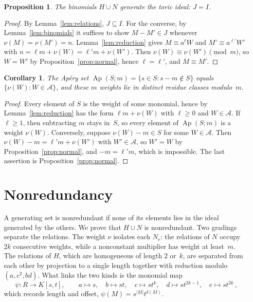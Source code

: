 \documentclass[11pt,letterpaper]{article}
\numberwithin{equation}{section}
\theoremstyle{plain}
\newtheorem{proposition}[theorem]{Proposition}
\newtheorem{corollary}[theorem]{Corollary}
\theoremstyle{remark}
\newcommand{\Ap}{\operatorname{Ap}}
\newcommand{\NF}{\mathcal{A}}
\newcommand{\len}[1]{\lvert #1\rvert}
\begin{document}
\begin{proposition}\label{prop:generation}
The binomials $H\cup N$ generate the toric ideal: $J=I$.
\end{proposition}

\begin{proof}
By Lemma~\ref{lem:relations}, $J\subseteq I$. For the converse, by Lemma~\ref{lem:binomials} it suffices to show $M-M'\in J$ whenever $\nu(M)=\nu(M')=n$. Lemma~\ref{lem:reduction} gives $M\equiv a^{\ell}W$ and $M'\equiv a^{\ell'}W'$ with $n=\ell m+\nu(W)=\ell'm+\nu(W')$. Then $\nu(W)\equiv\nu(W')\pmod m$, so $W=W'$ by Proposition~\ref{prop:normal}, hence $\ell=\ell'$, and $M\equiv M'$.
\end{proof}

\begin{corollary}\label{cor:apery}
The Ap\'ery set $\Ap(S;m)=\{s\in S: s-m\notin S\}$ equals $\{\nu(W): W\in\NF\}$, and these $m$ weights lie in distinct residue classes modulo~$m$.
\end{corollary}

\begin{proof}
Every element of $S$ is the weight of some monomial, hence by Lemma~\ref{lem:reduction} has the form $\ell m+\nu(W)$ with $\ell\ge 0$ and $W\in\NF$. If $\ell\ge 1$, then subtracting $m$ stays in~$S$, so every element of $\Ap(S;m)$ is a weight $\nu(W)$. Conversely, suppose $\nu(W)-m\in S$ for some $W\in\NF$. Then $\nu(W)-m=\ell'm+\nu(W')$ with $W'\in\NF$, so $W'=W$ by Proposition~\ref{prop:normal}, and $-m=\ell'm$, which is impossible. The last assertion is Proposition~\ref{prop:normal}.
\end{proof}

\section{Nonredundancy}\label{sec:nonred}

A generating set is nonredundant if none of its elements lies in the ideal generated by the others. We prove that $H\cup N$ is nonredundant. Two gradings separate the relations. The weight $\nu$ isolates each $N_r$: the relations of $N$ occupy $2k$ consecutive weights, while a nonconstant multiplier has weight at least~$m$. The relations of $H$, which are homogeneous of length $2$ or~$k$, are separated from each other by projection to a single length together with reduction modulo $(a,c^2,bd)$. What links the two kinds is the monomial map
\begin{equation*}
\psi\colon R\to K[s,t],\qquad a\mapsto s,\quad b\mapsto st,\quad c\mapsto st^{k},\quad d\mapsto st^{2k-1},\quad e\mapsto st^{2k}\,,
\end{equation*}
which records length and offset, $\psi(M)=s^{\len{M}}t^{\delta(M)}$.
\end{document}
